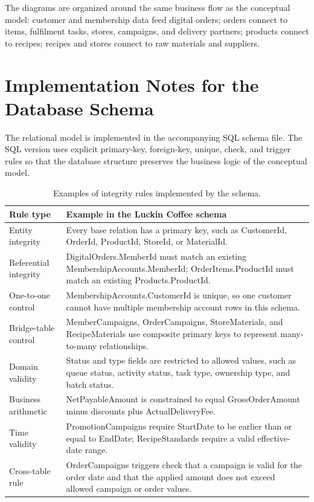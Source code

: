 \documentclass[12pt,a4paper]{article}
\begin{document}
The diagrams are organized around the same business flow as the conceptual model: customer and membership data feed digital orders; orders connect to items, fulfilment tasks, stores, campaigns, and delivery partners; products connect to recipes; recipes and stores connect to raw materials and suppliers.

\section{Implementation Notes for the Database Schema}

The relational model is implemented in the accompanying SQL schema file. The SQL version uses explicit primary-key, foreign-key, unique, check, and trigger rules so that the database structure preserves the business logic of the conceptual model.

\begin{table}[H]
\centering
\caption{Examples of integrity rules implemented by the schema.}
\small
\begin{tabularx}{\textwidth}{P{4.0cm}Y}
\toprule
\textbf{Rule type} & \textbf{Example in the Luckin Coffee schema} \\
\midrule
Entity integrity & Every base relation has a primary key, such as CustomerId, OrderId, ProductId, StoreId, or MaterialId. \\
Referential integrity & DigitalOrders.MemberId must match an existing MembershipAccounts.MemberId; OrderItems.ProductId must match an existing Products.ProductId. \\
One-to-one control & MembershipAccounts.CustomerId is unique, so one customer cannot have multiple membership account rows in this schema. \\
Bridge-table control & MemberCampaigns, OrderCampaigns, StoreMaterials, and RecipeMaterials use composite primary keys to represent many-to-many relationships. \\
Domain validity & Status and type fields are restricted to allowed values, such as queue status, activity status, task type, ownership type, and batch status. \\
Business arithmetic & NetPayableAmount is constrained to equal GrossOrderAmount minus discounts plus ActualDeliveryFee. \\
Time validity & PromotionCampaigns require StartDate to be earlier than or equal to EndDate; RecipeStandards require a valid effective-date range. \\
Cross-table rule & OrderCampaigns triggers check that a campaign is valid for the order date and that the applied amount does not exceed allowed campaign or order values. \\
\bottomrule
\end{tabularx}
\end{table}
\end{document}
